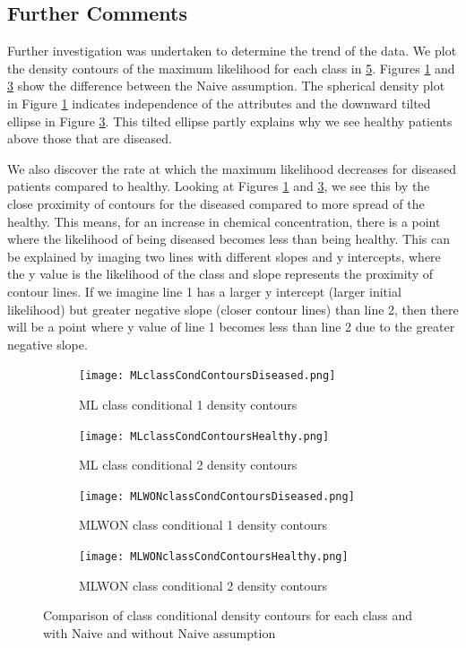 {\subsection{Further Comments}
Further investigation was undertaken to determine the trend of the data. We plot the density contours of the maximum likelihood for each class in \ref{fig:CMLdens}. Figures \ref{fig:cml1} and \ref{fig:cml3} show the difference between the Naive assumption. The spherical density plot in Figure \ref{fig:cml1} indicates independence of the attributes and the downward tilted ellipse in Figure \ref{fig:cml3}. This tilted ellipse partly explains why we see healthy patients above those that are diseased. 

We also discover the rate at which the maximum likelihood decreases for diseased patients compared to healthy. Looking at Figures \ref{fig:cml1} and \ref{fig:cml3}, we see this by the close proximity of contours for the diseased compared to more spread of the healthy. This means, for an increase in chemical concentration, there is a point where the likelihood of being diseased becomes less than being healthy. This can be explained by imaging two lines with different slopes and y intercepts, where the y value is the likelihood of the class and slope represents the proximity of contour lines. If we imagine line 1 has a larger y intercept (larger initial likelihood) but greater negative slope (closer contour lines) than line 2, then there will be a point where y value of line 1 becomes less than line 2 due to the greater negative slope. 

\begin{figure}[h!] 
	\centering
	\begin{subfigure}[b]{.40\textwidth}
		\texttt{[image: MLclassCondContoursDiseased.png]}
		\caption{ML class conditional 1 density contours}
		\label{fig:cml1}
	\end{subfigure}
	\begin{subfigure}[b]{.40\textwidth}
		\texttt{[image: MLclassCondContoursHealthy.png]}
		\caption{ML class conditional 2 density contours}
		\label{fig:cml2}
	\end{subfigure}
	\begin{subfigure}[b]{.40\textwidth}
		\texttt{[image: MLWONclassCondContoursDiseased.png]}
		\caption{MLWON class conditional 1 density contours}
		\label{fig:cml3}
	\end{subfigure}
	\begin{subfigure}[b]{.40\textwidth}
		\texttt{[image: MLWONclassCondContoursHealthy.png]}
		\caption{MLWON class conditional 2 density contours}
		\label{fig:cml4}
	\end{subfigure}
	\caption{Comparison of class conditional density contours for each class and with Naive and without Naive assumption}
	\label{fig:CMLdens}
\end{figure}

}
